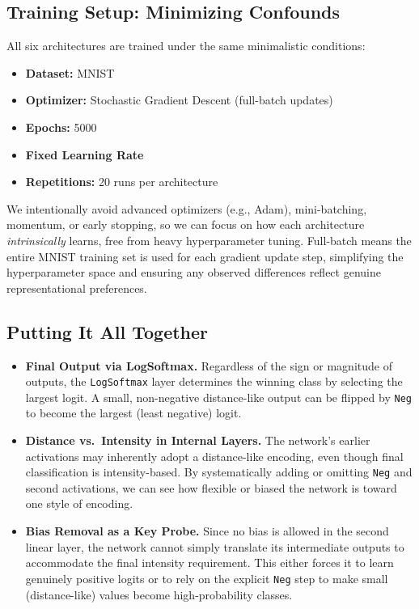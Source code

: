 \subsection{Training Setup: Minimizing Confounds}
All six architectures are trained under the same minimalistic conditions:
\begin{itemize}
    \item \textbf{Dataset:} MNIST
    \item \textbf{Optimizer:} Stochastic Gradient Descent (full-batch updates)
    \item \textbf{Epochs:} 5000
    \item \textbf{Fixed Learning Rate}
    \item \textbf{Repetitions:} 20 runs per architecture
\end{itemize}
We intentionally avoid advanced optimizers (e.g., Adam), mini-batching, momentum, or early stopping, so we can focus on how each architecture \emph{intrinsically} learns, free from heavy hyperparameter tuning. Full-batch means the entire MNIST training set is used for each gradient update step, simplifying the hyperparameter space and ensuring any observed differences reflect genuine representational preferences.

\subsection{Putting It All Together}
\label{sec:design_discussion}
\begin{itemize}
    \item \textbf{Final Output via LogSoftmax.} Regardless of the sign or magnitude of outputs, the \texttt{LogSoftmax} layer determines the winning class by selecting the largest logit. A small, non-negative distance-like output can be flipped by \texttt{Neg} to become the largest (least negative) logit.
    \item \textbf{Distance vs.\ Intensity in Internal Layers.} The network's earlier activations may inherently adopt a distance-like encoding, even though final classification is intensity-based. By systematically adding or omitting \texttt{Neg} and second activations, we can see how flexible or biased the network is toward one style of encoding.
    \item \textbf{Bias Removal as a Key Probe.} Since no bias is allowed in the second linear layer, the network cannot simply translate its intermediate outputs to accommodate the final intensity requirement. This either forces it to learn genuinely positive logits or to rely on the explicit \texttt{Neg} step to make small (distance-like) values become high-probability classes.
\end{itemize}

